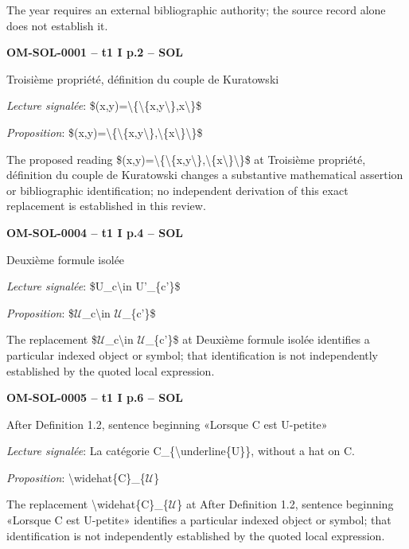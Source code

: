 The year requires an external bibliographic authority; the source record alone does not establish it.\par
\par\noindent\textbf{OM-SOL-0001 -- t1 I p.2 -- SOL}\par
Troisième propriété, définition du couple de Kuratowski\par
\emph{Lecture signalée}: \$(x,y)=\allowbreak \textbackslash{}\{\textbackslash{}\{x,y\textbackslash{}\},x\textbackslash{}\}\$\par
\emph{Proposition}: \$(x,y)=\allowbreak \textbackslash{}\{\textbackslash{}\{x,y\textbackslash{}\},\textbackslash{}\{x\textbackslash{}\}\textbackslash{}\}\$\par
The proposed reading \$(x,y)=\allowbreak \textbackslash{}\{\textbackslash{}\{x,y\textbackslash{}\},\textbackslash{}\{x\textbackslash{}\}\textbackslash{}\}\$ at Troisième propriété, définition du couple de Kuratowski changes a substantive mathematical assertion or bibliographic identification; no independent derivation of this exact replacement is established in this review.\par
\par\noindent\textbf{OM-SOL-0004 -- t1 I p.4 -- SOL}\par
Deuxième formule isolée\par
\emph{Lecture signalée}: \$U\_c\textbackslash{}in U'\_\{c'\}\$\par
\emph{Proposition}: \$\ensuremath{𝒰}\_c\textbackslash{}in \ensuremath{𝒰}\_\{c'\}\$\par
The replacement \$\ensuremath{𝒰}\_c\textbackslash{}in \ensuremath{𝒰}\_\{c'\}\$ at Deuxième formule isolée identifies a particular indexed object or symbol; that identification is not independently established by the quoted local expression.\par
\par\noindent\textbf{OM-SOL-0005 -- t1 I p.6 -- SOL}\par
After Definition 1.2, sentence beginning «Lorsque C est U-petite»\par
\emph{Lecture signalée}: La catégorie C\_\{\textbackslash{}underline\{U\}\}, without a hat on C.\par
\emph{Proposition}: \textbackslash{}widehat\{C\}\_\{\ensuremath{𝒰}\}\par
The replacement \textbackslash{}widehat\{C\}\_\{\ensuremath{𝒰}\} at After Definition 1.2, sentence beginning «Lorsque C est U-petite» identifies a particular indexed object or symbol; that identification is not independently established by the quoted local expression.\par
